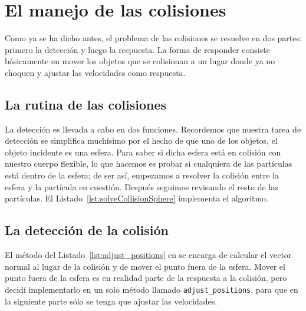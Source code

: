 \section{El manejo de las colisiones}
Como ya se ha dicho antes, el problema de las colisiones se resuelve en dos partes: primero la detección y luego la respuesta.
La forma de responder consiste básicamente en mover los objetos que se colisionan a un lugar donde ya no choquen y ajustar las velocidades como respuesta.

\subsection{La rutina de las colisiones}
La detección es llevada a cabo en dos funciones.
Recordemos que nuestra tarea de detección se simplifica muchísimo por el hecho de que uno de los objetos, el objeto incidente es una esfera.
Para saber si dicha esfera está en colisión con nuestro cuerpo flexible, lo que hacemos es probar si cualquiera de las partículas está dentro de la esfera; de ser así, empezamos a resolver la colisión entre la esfera y la partícula en cuestión. Después seguimos revisando el resto de las partículas.
El Listado~\ref{lst:solveCollisionSphere} implementa el algoritmo.


\subsection{La detección de la colisión}
El método del Listado~\ref{lst:adjust_positions} en se encarga de calcular el vector normal al lugar de la colisión y de mover el punto fuera de la esfera.
Mover el punto fuera de la esfera es en realidad parte de la respuesta a la colisión, pero decidí implementarlo en un solo método llamado \texttt{adjust_positions}, para que en la siguiente parte sólo se tenga que ajustar las velocidades.


